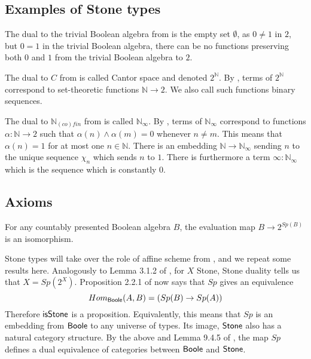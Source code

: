 \documentclass{../util/zariski-small}
\begin{document}
\subsection{Examples of Stone types}
\begin{example}\label{ExampleBAunderEmpty}
  The dual to the trivial Boolean algebra from  is the empty set 
  $\emptyset$, 
  as $0\neq 1$ in $2$, but $0=1$ in the trivial Boolean algebra, 
  there can be no functions preserving both $0$ and $1$ 
  from the trivial Boolean algebra to $2$. 
\end{example}
\begin{example}
  The dual to $C$ from  is called Cantor space 
  and denoted $2^\mathbb N$. 
  By , terms of $2^\mathbb N$ 
  correspond to set-theoretic functions $\mathbb N \to 2$. 
  We also call such functions binary sequences. 
\end{example}
\begin{example}
  The dual to $\mathbb N_{(co)fin}$ from  is called 
  $\mathbb N_\infty$. By , terms of $\mathbb N_\infty$ 
  correspond to functions $\alpha: \mathbb N \to 2$ such that $\alpha(n) \wedge \alpha(m) = 0$ 
  whenever $n \neq m$. This means that $\alpha(n) = 1$ for at most one $n\in\mathbb N$. 
  There is an embedding $\mathbb N \to \mathbb N_\infty$ sending $n$ to the unique sequence $\chi_n$
  which sends $n$ to $1$. 
  There is furthermore a term $\infty:\mathbb N_\infty$ which is the sequence which is constantly $0$. 
\end{example}
\subsection{Axioms}
\begin{axiomNum}
  For any countably presented Boolean algebra $B$, the evaluation map $B\rightarrow  2^{Sp(B)}$ is an isomorphism.
\end{axiomNum} 

\begin{remark}
Stone types will take over the role of affine scheme from \cite{draft}, 
and we repeat some results here. 
Analogously to Lemma 3.1.2 of \cite{draft}, 
for $X$ Stone, Stone duality tells us that $X = Sp(2^X)$. 
%
Proposition 2.2.1 of \cite{draft} now says that 
$Sp$ gives an equivalence 
\begin{equation}
   Hom_{\mathsf{Boole}} (A, B) = (Sp(B) \to Sp(A))
\end{equation}
Therefore $\mathsf{isStone}$ is a proposition.
Equivalently, 
this means that 
$Sp$ is an embedding from $\mathsf{Boole}$ to any universe of types.
Its image, $\mathsf{Stone}$ also has a natural category structure.
By the above and Lemma 9.4.5 of \cite{hott}, 
the map $Sp$ defines a dual equivalence of categories between $\mathsf{Boole}$ and $\mathsf{Stone}$.
\end{remark}
\end{document}
